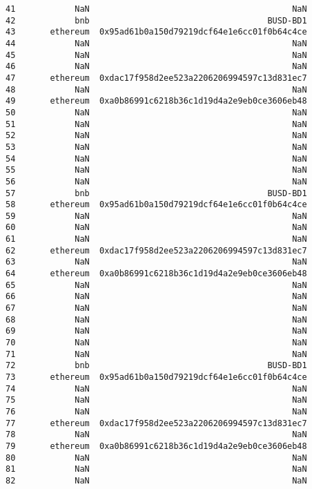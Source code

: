 \documentclass[11pt]{article}
\begin{document}
\begin{tcolorbox}[breakable, size=fbox, boxrule=.5pt, pad at break*=1mm, opacityfill=0]
\begin{Verbatim}[commandchars=\\\{\}]
41            NaN                                         NaN
42            bnb                                    BUSD-BD1
43       ethereum  0x95ad61b0a150d79219dcf64e1e6cc01f0b64c4ce
44            NaN                                         NaN
45            NaN                                         NaN
46            NaN                                         NaN
47       ethereum  0xdac17f958d2ee523a2206206994597c13d831ec7
48            NaN                                         NaN
49       ethereum  0xa0b86991c6218b36c1d19d4a2e9eb0ce3606eb48
50            NaN                                         NaN
51            NaN                                         NaN
52            NaN                                         NaN
53            NaN                                         NaN
54            NaN                                         NaN
55            NaN                                         NaN
56            NaN                                         NaN
57            bnb                                    BUSD-BD1
58       ethereum  0x95ad61b0a150d79219dcf64e1e6cc01f0b64c4ce
59            NaN                                         NaN
60            NaN                                         NaN
61            NaN                                         NaN
62       ethereum  0xdac17f958d2ee523a2206206994597c13d831ec7
63            NaN                                         NaN
64       ethereum  0xa0b86991c6218b36c1d19d4a2e9eb0ce3606eb48
65            NaN                                         NaN
66            NaN                                         NaN
67            NaN                                         NaN
68            NaN                                         NaN
69            NaN                                         NaN
70            NaN                                         NaN
71            NaN                                         NaN
72            bnb                                    BUSD-BD1
73       ethereum  0x95ad61b0a150d79219dcf64e1e6cc01f0b64c4ce
74            NaN                                         NaN
75            NaN                                         NaN
76            NaN                                         NaN
77       ethereum  0xdac17f958d2ee523a2206206994597c13d831ec7
78            NaN                                         NaN
79       ethereum  0xa0b86991c6218b36c1d19d4a2e9eb0ce3606eb48
80            NaN                                         NaN
81            NaN                                         NaN
82            NaN                                         NaN

\end{Verbatim}
\end{tcolorbox}
\end{document}
